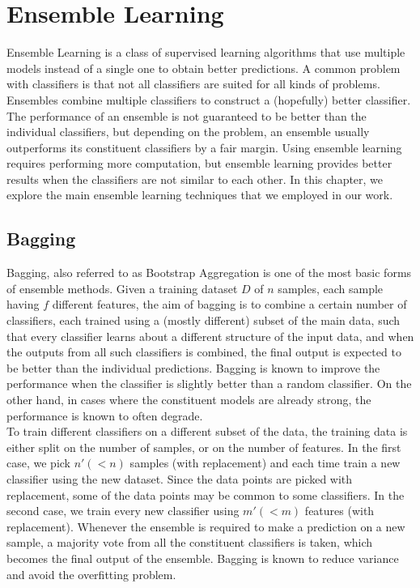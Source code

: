 \chapter{Ensemble Learning}
\label{chapter:Ensemble Learning}

Ensemble Learning is a class of supervised learning algorithms that use multiple models instead of a single one to obtain better predictions. A common problem with classifiers is that not all classifiers are suited for all kinds of problems. Ensembles combine multiple classifiers to construct a (hopefully) better classifier. The performance of an ensemble is not guaranteed to be better than the individual classifiers, but depending on the problem, an ensemble usually outperforms its constituent classifiers by a fair margin. Using ensemble learning requires performing more computation, but ensemble learning provides better results when the classifiers are not similar to each other. In this chapter, we explore the main ensemble learning techniques that we employed in our work.

\section{Bagging}
Bagging, also referred to as Bootstrap Aggregation is one of the most basic forms of ensemble methods. Given a training dataset $D$ of $n$ samples, each sample having $f$ different features, the aim of bagging is to combine a certain number of classifiers, each trained using a (mostly different) subset of the main data, such that every classifier learns about a different structure of the input data, and when the outputs from all such classifiers is combined, the final output is expected to be better than the individual predictions. Bagging is known to improve the performance when the classifier is slightly better than a random classifier. On the other hand, in cases where the constituent models are already strong, the performance is known to often degrade.\\

To train different classifiers on a different subset of the data, the training data is either split on the number of samples, or on the number of features. In the first case, we pick $n' (< n)$ samples (with replacement) and each time train a new classifier using the new dataset. Since the data points are picked with replacement, some of the data points may be common to some classifiers. In the second case, we train every new classifier using $m' (< m)$ features (with replacement). Whenever the ensemble is required to make a prediction on a new sample, a majority vote from all the constituent classifiers is taken, which becomes the final output of the ensemble. Bagging is known to reduce variance and avoid the overfitting problem.


